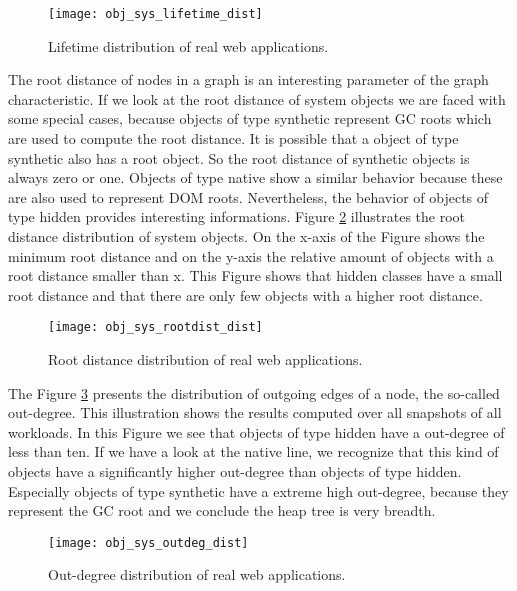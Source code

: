 \begin{figure}
	\centering
	\texttt{[image: obj\_sys\_lifetime\_dist]}
	\caption{Lifetime distribution of real web applications.}
	\label{fig:obj_sys_lieftiem_dist}
\end{figure}

The root distance of nodes in a graph is an interesting parameter of the graph characteristic. If we look at the root distance of system objects we are faced with some special cases, because objects of type synthetic represent GC roots which are used to compute the root distance. It is possible that a object of type synthetic also has a root object. So the root distance of synthetic objects is always zero or one. Objects of type native show a similar behavior because these are also used to represent DOM roots. Nevertheless, the behavior of objects of type hidden provides interesting informations. Figure \ref{fig:obj_sys_rootdist_dist} illustrates the root distance distribution of system objects. On the x-axis of the Figure shows the minimum root distance and on the y-axis the relative amount of objects with a root distance smaller than x. This Figure shows that hidden classes have a small root distance and that there are only few objects with a higher root distance.

\begin{figure}
	\centering
	\texttt{[image: obj\_sys\_rootdist\_dist]}
	\caption{Root distance distribution of real web applications.}
	\label{fig:obj_sys_rootdist_dist}
\end{figure}

The Figure \ref{fig:obj_sys_outdeg_dist} presents the distribution of outgoing edges of a node, the so-called out-degree. This illustration shows the results computed over all snapshots of all workloads. In this Figure we see that objects of type hidden have a out-degree of less than ten. If we have a look at the native line, we recognize that this kind of objects have a significantly higher out-degree than objects of type hidden. Especially objects of type synthetic have a extreme high out-degree, because they represent the GC root and we conclude the heap tree is very breadth.   

\begin{figure}
	\centering
	\texttt{[image: obj\_sys\_outdeg\_dist]}
	\caption{Out-degree distribution of real web applications.}
	\label{fig:obj_sys_outdeg_dist}
\end{figure}

% 
